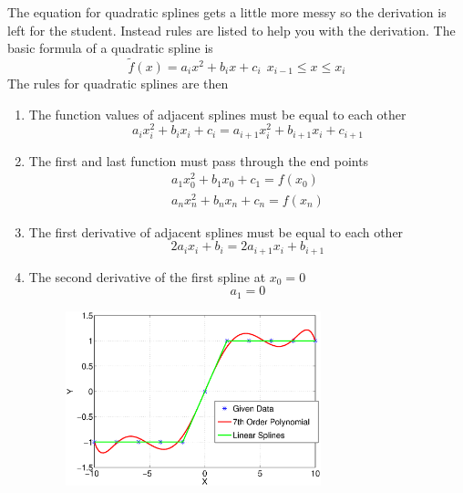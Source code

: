\begin{enumerate}
The equation for quadratic splines gets a little more messy so the
derivation is left for the student. Instead rules are listed to help
you with the derivation. The basic formula of a quadratic spline is
\begin{equation}
\tilde{f}(x) = a_{i} x^2 + b_{i} x + c_i~~x_{i-1}\leq x \leq x_i
\end{equation}
The rules for quadratic splines are then
\begin{enumerate}
\item The function values of adjacent splines must be equal to each
  other
  \begin{equation}
    a_i x_{i}^2 + b_i x_{i} + c_i = a_{i+1} x_{i}^2 + b_{i+1} x_i + c_{i+1}
  \end{equation}
\item The first and last function must pass through the end points
  \begin{equation}
    \begin{matrix}
      a_1 x_0^2 + b_1 x_0 + c_1 = f(x_0) \\
      a_n x_n^2 + b_n x_n + c_n = f(x_n)
    \end{matrix}
  \end{equation}
\item The first derivative of adjacent splines must be equal to each
  other
  \begin{equation}
    2 a_i x_{i} + b_i = 2 a_{i+1} x_{i} + b_{i+1}
  \end{equation}
\item The second derivative of the first spline at $x_0 = 0$ 
  \begin{equation}
    a_1 = 0
  \end{equation}

\begin{figure}[H]
  \begin{center}
    \includegraphics[height=0.5\textwidth,width=0.7\textwidth]{Graphics/Linear_Splines.eps}
  \end{center}
\end{figure}


\end{enumerate}
\end{enumerate}
